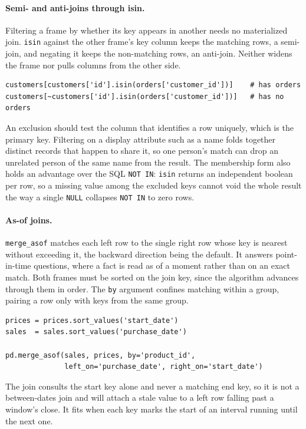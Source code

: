 \vspace{-1ex}

\paragraph{Semi- and anti-joins through isin.} Filtering a frame by whether its key appears in another needs no materialized join. \texttt{isin} against the other frame's key column keeps the matching rows, a semi-join, and negating it keeps the non-matching rows, an anti-join. Neither widens the frame nor pulls columns from the other side.

\begin{lstlisting}[style=python, caption={Semi-join keeps matches, anti-join keeps non-matches}]
customers[customers['id'].isin(orders['customer_id'])]    # has orders
customers[~customers['id'].isin(orders['customer_id'])]   # has no orders
\end{lstlisting}

\begin{keybox}
An exclusion should test the column that identifies a row uniquely, which is the primary key. Filtering on a display attribute such as a name folds together distinct records that happen to share it, so one person's match can drop an unrelated person of the same name from the result. The membership form also holds an advantage over the SQL \texttt{NOT IN}: \texttt{isin} returns an independent boolean per row, so a missing value among the excluded keys cannot void the whole result the way a single \texttt{NULL} collapses \texttt{NOT IN} to zero rows.
\end{keybox}

\paragraph{As-of joins.} \texttt{merge\_asof} matches each left row to the single right row whose key is nearest without exceeding it, the backward direction being the default. It answers point-in-time questions, where a fact is read as of a moment rather than on an exact match. Both frames must be sorted on the join key, since the algorithm advances through them in order. The \texttt{by} argument confines matching within a group, pairing a row only with keys from the same group.

\newpage

\begin{lstlisting}[style=python, caption={Match each sale to the price in effect at its date}]
prices = prices.sort_values('start_date')
sales  = sales.sort_values('purchase_date')

pd.merge_asof(sales, prices, by='product_id',
              left_on='purchase_date', right_on='start_date')
\end{lstlisting}

\vspace{-1ex}

The join consults the start key alone and never a matching end key, so it is not a between-dates join and will attach a stale value to a left row falling past a window's close. It fits when each key marks the start of an interval running until the next one.
